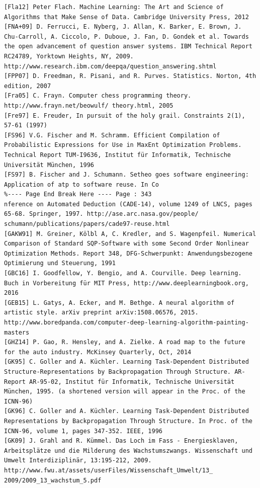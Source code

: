 \documentclass[10pt]{article}
\begin{document}
\begin{verbatim}
[Fla12] Peter Flach. Machine Learning: The Art and Science of Algorithms that Make Sense of Data. Cambridge University Press, 2012
[FNA+09] D. Ferrucci, E. Nyberg, J. Allan, K. Barker, E. Brown, J. Chu-Carroll, A. Ciccolo, P. Duboue, J. Fan, D. Gondek et al. Towards the open advancement of question answer systems. IBM Technical Report RC24789, Yorktown Heights, NY, 2009. http://www.research.ibm.com/deepqa/question_answering.shtml
[FPP07] D. Freedman, R. Pisani, and R. Purves. Statistics. Norton, 4th edition, 2007
[Fra05] C. Frayn. Computer chess programming theory. http://www.frayn.net/beowulf/ theory.html, 2005
[Fre97] E. Freuder, In pursuit of the holy grail. Constraints 2(1), 57-61 (1997)
[FS96] V.G. Fischer and M. Schramm. Efficient Compilation of Probabilistic Expressions for Use in MaxEnt Optimization Problems. Technical Report TUM-I9636, Institut für Informatik, Technische Universität München, 1996
[FS97] B. Fischer and J. Schumann. Setheo goes software engineering: Application of atp to software reuse. In Co
%---- Page End Break Here ---- Page : 343
nference on Automated Deduction (CADE-14), volume 1249 of LNCS, pages 65-68. Springer, 1997. http://ase.arc.nasa.gov/people/ schumann/publications/papers/cade97-reuse.html
[GAKW91] M. Greiner, Kölbl A, C. Kredler, and S. Wagenpfeil. Numerical Comparison of Standard SQP-Software with some Second Order Nonlinear Optimization Methods. Report 348, DFG-Schwerpunkt: Anwendungsbezogene Optimierung und Steuerung, 1991
[GBC16] I. Goodfellow, Y. Bengio, and A. Courville. Deep learning. Buch in Vorbereitung für MIT Press, http://www.deeplearningbook.org, 2016
[GEB15] L. Gatys, A. Ecker, and M. Bethge. A neural algorithm of artistic style. arXiv preprint arXiv:1508.06576, 2015. http://www.boredpanda.com/computer-deep-learning-algorithm-painting-masters
[GHZ14] P. Gao, R. Hensley, and A. Zielke. A road map to the future for the auto industry. McKinsey Quarterly, Oct, 2014
[GK95] C. Goller and A. Küchler. Learning Task-Dependent Distributed Structure-Representations by Backpropagation Through Structure. AR-Report AR-95-02, Institut für Informatik, Technische Universität München, 1995. (a shortened version will appear in the Proc. of the ICNN-96)
[GK96] C. Goller and A. Küchler. Learning Task-Dependent Distributed Representations by Backpropagation Through Structure. In Proc. of the ICNN-96, volume 1, pages 347-352. IEEE, 1996
[GK09] J. Grahl and R. Kümmel. Das Loch im Fass - Energiesklaven, Arbeitsplätze und die Milderung des Wachstumszwangs. Wissenschaft und Umwelt Interdiziplinär, 13:195-212, 2009. http://www.fwu.at/assets/userFiles/Wissenschaft_Umwelt/13_ 2009/2009_13_wachstum_5.pdf

\end{verbatim}
\end{document}
